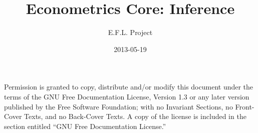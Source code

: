 \documentclass[nofonts]{tufte-latex/tufte-handout}
\title{Econometrics Core: Inference}
\author{E.F.L. Project}
\date{2013-05-19}
\begin{document}
\maketitle
\tableofcontents

  Permission is granted to
copy, distribute and/or modify this document under the terms of the
GNU Free Documentation License, Version 1.3 or any later version
published by the Free Software Foundation; with no Invariant Sections,
no Front-Cover Texts, and no Back-Cover Texts.  A copy of the license
is included in the section entitled ``GNU Free Documentation
License.''







\appendix

\end{document}
